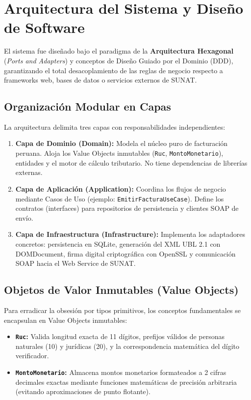 \documentclass[11pt,a4paper]{article}
\begin{document}
\section{Arquitectura del Sistema y Diseño de Software}

El sistema fue diseñado bajo el paradigma de la \textbf{Arquitectura Hexagonal} (\textit{Ports and Adapters}) y conceptos de Diseño Guiado por el Dominio (DDD), garantizando el total desacoplamiento de las reglas de negocio respecto a frameworks web, bases de datos o servicios externos de SUNAT.

\subsection{Organización Modular en Capas}
La arquitectura delimita tres capas con responsabilidades independientes:
\begin{enumerate}[noitemsep]
    \item \textbf{Capa de Dominio (Domain):} Modela el núcleo puro de facturación peruana. Aloja los Value Objects inmutables (\texttt{Ruc}, \texttt{MontoMonetario}), entidades y el motor de cálculo tributario. No tiene dependencias de librerías externas.
    \item \textbf{Capa de Aplicación (Application):} Coordina los flujos de negocio mediante Casos de Uso (ejemplo: \texttt{EmitirFacturaUseCase}). Define los contratos (interfaces) para repositorios de persistencia y clientes SOAP de envío.
    \item \textbf{Capa de Infraestructura (Infrastructure):} Implementa los adaptadores concretos: persistencia en SQLite, generación del XML UBL 2.1 con DOMDocument, firma digital criptográfica con OpenSSL y comunicación SOAP hacia el Web Service de SUNAT.
\end{enumerate}

\subsection{Objetos de Valor Inmutables (Value Objects)}
Para erradicar la obsesión por tipos primitivos, los conceptos fundamentales se encapsulan en Value Objects inmutables:
\begin{itemize}[noitemsep]
    \item \textbf{\texttt{Ruc}:} Valida longitud exacta de 11 dígitos, prefijos válidos de personas naturales (10) y jurídicas (20), y la correspondencia matemática del dígito verificador.
    \item \textbf{\texttt{MontoMonetario}:} Almacena montos monetarios formateados a 2 cifras decimales exactas mediante funciones matemáticas de precisión arbitraria (evitando aproximaciones de punto flotante).
\end{itemize}
\end{document}
